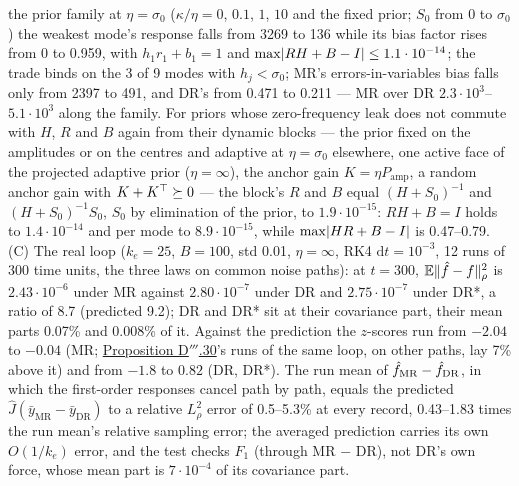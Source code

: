 \begin{sloppypar}
the prior family at $\eta = \sigma_0$ ($\kappa/\eta = 0$, $0.1$, $1$, $10$ and the fixed prior; $S_0$ from 0 to
$\sigma_0$) the weakest mode's response falls from 3269 to 136 while its bias factor rises from 0 to 0.959, with
$h_1r_1 + b_1 = 1$ and $\max\lvert RH + B - I\rvert\le1.1\cdot10^{-14}$; the trade binds on the 3 of 9 modes with
$h_j < \sigma_0$; MR's errors-in-variables bias falls only from 2397 to 491, and DR's from 0.471 to 0.211 --- MR over
DR $2.3\cdot10^3$--$5.1\cdot10^3$ along the family. For priors whose zero-frequency leak does not commute with $H$, $R$
and $B$ again from their dynamic blocks --- the prior fixed on the amplitudes or on the centres and adaptive at
$\eta = \sigma_0$ elsewhere, one active face of the projected adaptive prior ($\eta = \infty$), the anchor gain
$K = \eta P_{\mathrm{amp}}$, a random anchor gain with $K + K^\top\succeq0$ --- the block's $R$ and $B$ equal
$(H + S_0)^{-1}$ and $(H + S_0)^{-1}S_0$, $S_0$ by elimination of the prior, to $1.9\cdot10^{-15}$: $RH + B = I$ holds
to $1.4\cdot10^{-14}$ and per mode to $8.9\cdot10^{-15}$, while $\max\lvert HR + B - I\rvert$ is 0.47--0.79. (C) The real
loop ($k_e = 25$, $B = 100$, std 0.01, $\eta = \infty$, RK4 $\mathrm{d}t = 10^{-3}$, 12 runs of 300 time units, the
three laws on common noise paths): at $t = 300$, $\mathbb{E}\lVert \hat f - f\rVert^2_\rho$ is $2.43\cdot10^{-6}$ under MR against
$2.80\cdot10^{-7}$ under DR and $2.75\cdot10^{-7}$ under DR*, a ratio of 8.7 (predicted 9.2); DR and DR* sit at their
covariance part, their mean parts 0.07\% and 0.008\% of it. Against the prediction the $z$-scores run from $-2.04$ to
$-0.04$ (MR; \hyperref[res:thmDppp:30]{Proposition D$'''$.30}'s runs of the same loop, on other paths, lay 7\% above
it) and from $-1.8$ to $0.82$ (DR, DR*). The run mean of $\hat f_{\mathrm{MR}} - \hat f_{\mathrm{DR}}$, in which the
first-order responses cancel path by path, equals the predicted $\hat J(\bar y_{\mathrm{MR}} - \bar y_{\mathrm{DR}})$
to a relative $L^2_\rho$ error of 0.5--5.3\% at every record, 0.43--1.83 times the run mean's relative sampling error;
the averaged prediction carries its own $O(1/k_e)$ error, and the test checks $F_1$ (through MR $-$ DR), not DR's own
force, whose mean part is $7\cdot10^{-4}$ of its covariance part.
\end{sloppypar}

